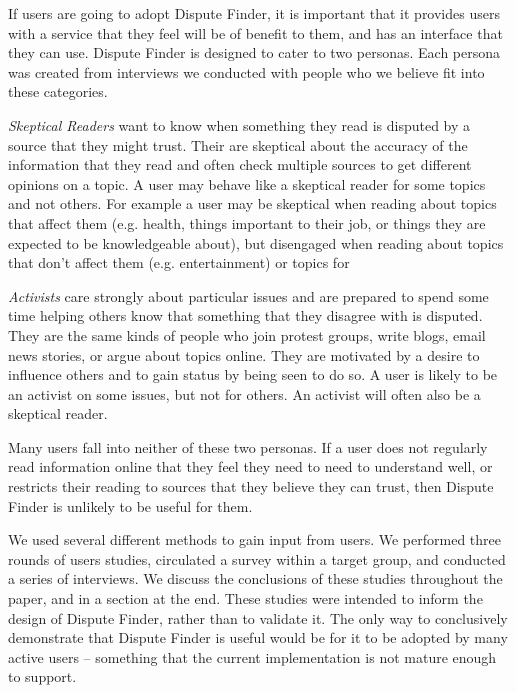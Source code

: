 \documentclass{www2010-submission}
\newcommand{\todo}[1]{}
\begin{document}
If users are going to adopt Dispute Finder, it is important that it provides users with a service that they feel will be of benefit to them, and has an interface that they can use. Dispute Finder is designed to cater to two personas. Each persona was created from interviews we conducted with people who we believe fit into these categories.

{\it Skeptical Readers} want to know when something they read is disputed by a source that they might trust. Their are skeptical about the accuracy of the information that they read and often check multiple sources to get different opinions on a topic. A user may behave like a skeptical reader for some topics and not others. For example a user may be skeptical when reading about topics that affect them (e.g. health, things important to their job, or things they are expected to be knowledgeable about), but disengaged when reading about topics that don't affect them (e.g. entertainment) or topics for 
\todo{Use interviews to get some actual observations here. These are just fillers.}

{\it Activists} care strongly about particular issues and are prepared to spend some time helping others know that something that they disagree with is disputed. They are the same kinds of people who join protest groups, write blogs, email news stories, or argue about topics online. They are motivated by a desire to influence others and to gain status by being seen to do so. A user is likely to be an activist on some issues, but not for others. An activist will often also be a skeptical reader.

Many users fall into neither of these two personas. If a user does not regularly read information online that they feel they need to need to understand well, or restricts their reading to sources that they believe they can trust, then Dispute Finder is unlikely to be useful for them.

We used several different methods to gain input from users. We performed three rounds of users studies, circulated a survey within a target group, and conducted a series of interviews. We discuss the conclusions of these studies throughout the paper, and in a section at the end. These studies were intended to inform the design of Dispute Finder, rather than to validate it. The only way to conclusively demonstrate that Dispute Finder is useful would be for it to be adopted by many active users -- something that the current implementation is not mature enough to support.

\todo{Improve the paraphraser UI so it shows users what pages are making the claim}
\todo{Improve the ``see examples on the web'' UI to it shows the pages that were found with the activists training work}
\todo{Provide a customized RSS reader and search engine that does dispute tracking. - future work?}
\end{document}
